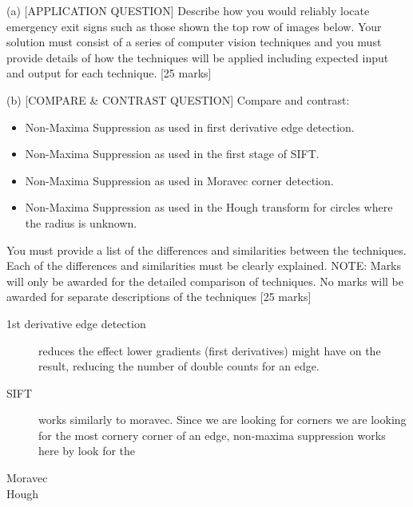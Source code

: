 \begin{tcolorbox}[title=Question]
  (a) [APPLICATION QUESTION] Describe how you would reliably locate emergency exit signs such as those shown the top row of images below.  Your solution must consist of a series of computer vision techniques and you must provide details of how the techniques will be applied including expected input and output for each technique.   [25 marks] 
\end{tcolorbox}

\newpage
\begin{tcolorbox}[title=Question]
  (b) [COMPARE \& CONTRAST QUESTION] Compare and contrast:
  \begin{itemize}
    \item Non-Maxima Suppression as used in first derivative edge detection. 
    \item Non-Maxima Suppression as used in the first stage of SIFT. 
    \item Non-Maxima Suppression as used in Moravec corner detection. 
    \item Non-Maxima Suppression as used in the Hough transform for circles where the radius is unknown.  
  \end{itemize}
  You must provide a list of the differences and similarities between the techniques.   Each of the differences and similarities must be clearly explained.  NOTE:  Marks will only be awarded for the detailed comparison of techniques.  No marks will be awarded for separate descriptions of the techniques                    [25 marks] 
\end{tcolorbox}

\begin{description}
  \item[1st derivative edge detection] reduces the effect lower gradients (first derivatives) might have on the result, reducing the number of double counts for an edge.
  \item[SIFT] works similarly to moravec. Since we are looking for corners we are looking for the most cornery corner of an edge, non-maxima suppression works here by look for the 
  \item[Moravec]
  
  \item[Hough] 
\end{description}